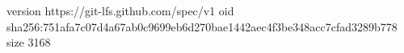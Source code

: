 version https://git-lfs.github.com/spec/v1
oid sha256:751afa7c07d4a67ab0c9699eb6d270bae1442aec4f3be348acc7cfad3289b778
size 3168
